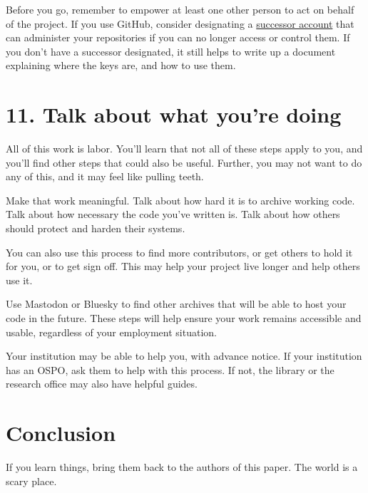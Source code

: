 \documentclass[10pt,letterpaper]{article}
\begin{document}
Before you go,
remember to empower at least one other person to act on behalf of the project.
If you use GitHub,
consider designating a
\href{https://docs.github.com/en/account-and-profile/setting-up-and-managing-your-personal-account-on-github/managing-access-to-your-personal-repositories/maintaining-ownership-continuity-of-your-personal-accounts-repositories}{successor account}
that can administer your repositories if you can no longer access or control them.
If you don't have a successor designated,
it still helps to write up a document explaining where the keys are,
and how to use them.

\section*{11. Talk about what you're doing}

All of this work is labor.
You'll learn that not all of these steps apply to you,
and you'll find other steps that could also be useful.
Further, you may not want to do any of this, and it may feel like pulling teeth.

Make that work meaningful.
Talk about how hard it is to archive working code.
Talk about how necessary the code you've written is.
Talk about how others should protect and harden their systems.

You can also use this process to find more contributors,
or get others to hold it for you,
or to get sign off.
This may help your project live longer and help others use it.

Use Mastodon or Bluesky to find other archives that will be able to host your code in the future.
These steps will help ensure your work remains accessible and usable,
regardless of your employment situation.

Your institution may be able to help you,
with advance notice.
If your institution has an OSPO,
ask them to help with this process.
If not,
the library or the research office may also have helpful guides.

\section*{Conclusion}

If you learn things, bring them back to the authors of this paper.
The world is a scary place.
\cite{Tamburri2020}


\end{document}
